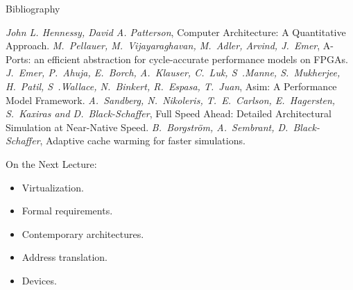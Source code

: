 \begin{frame}[allowframebreaks]{Bibliography}
\begin{thebibliography}{99}
\bibitem{} \textit{John L. Hennessy, David A. Patterson},
  Computer Architecture: A Quantitative Approach.
\bibitem{} \textit{M.~Pellauer, M.~Vijayaraghavan, M.~Adler, Arvind, J.~Emer},
  A-Ports: an efficient abstraction for cycle-accurate performance models on
  FPGAs.
\bibitem{} \textit{J.~Emer, P.~Ahuja, E.~Borch, A.~Klauser, C.~Luk,
  S~.Manne, S.~Mukherjee, H.~Patil, S~.Wallace, N.~Binkert, R.~Espasa, T.~Juan},
  Asim: A Performance Model Framework.
\bibitem{} \textit{A.~Sandberg, N.~Nikoleris, T.~E.~Carlson, E.~Hagersten,
  S.~Kaxiras and D.~Black-Schaffer}, Full Speed Ahead: Detailed Architectural
  Simulation at Near-Native Speed.
\bibitem{} \textit{B.~Borgstr\"{o}m, A.~Sembrant, D.~Black-Schaffer}, Adaptive
  cache warming for faster simulations.
\end{thebibliography}
\end{frame}

\begin{frame}{On the Next Lecture:}
\begin{itemize}
\item Virtualization.
\item Formal requirements.
\item Contemporary architectures.
\item Address translation.
\item Devices.
\end{itemize}
\end{frame}

\finalslide


